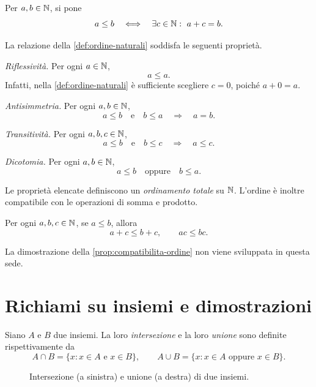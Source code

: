 \begin{definition}
\label{def:ordine-naturali}
Per \(a,b\in\mathbb{N}\), si pone
\[
  a\le b
  \quad\Longleftrightarrow\quad
  \exists c\in\mathbb{N}:\ a+c=b.
\]
\end{definition}

La relazione della \cref{def:ordine-naturali} soddisfa le seguenti
proprietà.

\emph{Riflessività.}
Per ogni \(a\in\mathbb{N}\),
\[
  a\le a.
\]
Infatti, nella \cref{def:ordine-naturali} è sufficiente
scegliere \(c=0\), poiché \(a+0=a\).

\emph{Antisimmetria.}
Per ogni \(a,b\in\mathbb{N}\),
\[
  a\le b
  \quad\text{e}\quad
  b\le a
  \quad\Longrightarrow\quad
  a=b.
\]

\emph{Transitività.}
Per ogni \(a,b,c\in\mathbb{N}\),
\[
  a\le b
  \quad\text{e}\quad
  b\le c
  \quad\Longrightarrow\quad
  a\le c.
\]

\emph{Dicotomia.}
Per ogni \(a,b\in\mathbb{N}\),
\[
  a\le b
  \quad\text{oppure}\quad
  b\le a.
\]

Le proprietà elencate definiscono un \emph{ordinamento totale}
su \(\mathbb{N}\). L'ordine è inoltre compatibile con le operazioni
di somma e prodotto.

\begin{proposition}
\label{prop:compatibilita-ordine}
Per ogni \(a,b,c\in\mathbb{N}\), se \(a\le b\), allora
\[
  a+c\le b+c,
  \qquad
  ac\le bc.
\]
\end{proposition}

La dimostrazione della \cref{prop:compatibilita-ordine}
non viene sviluppata in questa sede.

\section{Richiami su insiemi e dimostrazioni}
\label{sec:lez01-insiemi-dimostrazioni}

Siano \(A\) e \(B\) due insiemi. La loro \emph{intersezione}
e la loro \emph{unione} sono definite rispettivamente da
\[
  A\cap B=\{x:x\in A\text{ e }x\in B\},
  \qquad
  A\cup B=\{x:x\in A\text{ oppure }x\in B\}.
\]

\begin{figure}[htbp]
  \centering
  
  \caption{Intersezione (a sinistra) e unione (a destra)
  di due insiemi.}
  \label{fig:venn-operazioni}
\end{figure}

\clearpage

